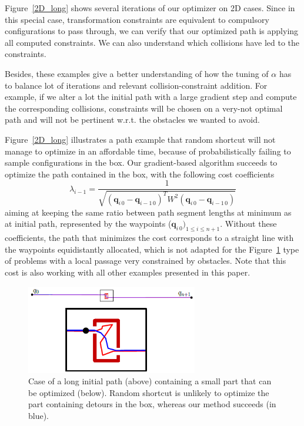 \documentclass{tADR2e}
\newcommand\conf{\mathbf{q}}
\newcommand\weight{W}
\begin{document}
Figure~\ref{2D_long} shows several iterations of our optimizer on 2D cases. Since 
in this special case, transformation constraints are equivalent to compulsory 
configurations to pass through, we can verify that our optimized path is applying 
all computed constraints. We can also understand which collisions have led to 
the constraints.

Besides, these examples give a better understanding of how the tuning of $\alpha$ 
has to balance lot of iterations and relevant collision-constraint addition. For 
example, if we alter a lot the initial path with a large gradient step and 
compute the corresponding collisions, constraints will be chosen on a very-not 
optimal path and will not be pertinent w.r.t. the obstacles we wanted to 
avoid.

Figure~\ref{2D_long} illustrates a path example that random shortcut will not manage to 
optimize in an affordable time, because of probabilistically failing to sample 
configurations in the box. Our gradient-based algorithm succeeds to optimize the 
path contained in the box, with the following cost coefficients 
$$
\lambda_{i-1} = \frac{1}{\sqrt{(\conf_{i\,0}-\conf_{i-1\,0})^T \weight^2 
(\conf_{i\,0}-\conf_{i-1\,0})}}
$$
aiming at keeping the same ratio between path segment lengths at 
minimum as at 
initial path, represented by the waypoints ($\conf_{i\,0})_{1\leq i\leq n+1}$.
Without these coefficients, the path that minimizes the cost corresponds to a 
straight line with the waypoints equidistantly allocated, which is not adapted for 
the Figure~\ref{local_box_optim} type of problems with a local passage very
constrained by obstacles. Note that this cost is also working with all other 
examples presented in this paper.


\begin{figure}[t]
	\centering
	\includegraphics[width=7.5cm]{local_box_optim.png}
	\caption{Case of a long initial path (above) containing a small part that can 
	be optimized (below). Random shortcut is unlikely to optimize the part containing detours in the box, whereas our method 
	succeeds (in blue).}
	\label{local_box_optim}
\end{figure}
\end{document}
